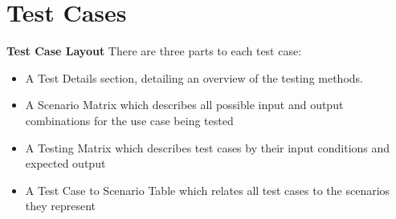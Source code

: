 \section{Test Cases}
\textbf{Test Case Layout} There are three parts to each test case:
\begin{itemize}
	\item A Test Details section, detailing an overview of the testing methods.
	\item A Scenario Matrix which describes all possible input and output combinations for the use case being tested
	\item A Testing Matrix which describes test cases by their input conditions and expected output
	\item A Test Case to Scenario Table which relates all test cases to the scenarios they represent
\end {itemize}





